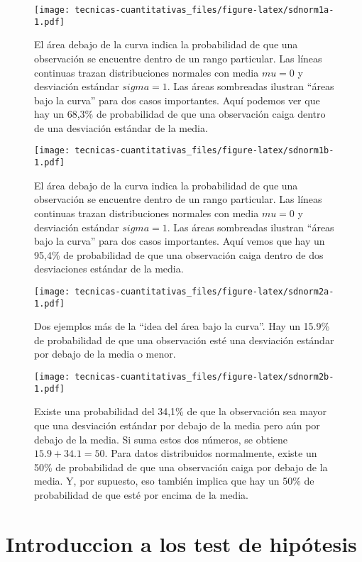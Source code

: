 \documentclass[
]{book}
\begin{document}
\begin{figure}
\centering
\texttt{[image: tecnicas-cuantitativas\_files/figure-latex/sdnorm1a-1.pdf]}
\caption{\label{fig:sdnorm1a}El área debajo de la curva indica la probabilidad de que una observación se encuentre dentro de un rango particular. Las líneas continuas trazan distribuciones normales con media \(mu=0\) y desviación estándar \(sigma=1\). Las áreas sombreadas ilustran ``áreas bajo la curva'' para dos casos importantes. Aquí podemos ver que hay un 68,3\% de probabilidad de que una observación caiga dentro de una desviación estándar de la media.}
\end{figure}

\begin{figure}
\centering
\texttt{[image: tecnicas-cuantitativas\_files/figure-latex/sdnorm1b-1.pdf]}
\caption{\label{fig:sdnorm1b}El área debajo de la curva indica la probabilidad de que una observación se encuentre dentro de un rango particular. Las líneas continuas trazan distribuciones normales con media \(mu = 0\) y desviación estándar \(sigma = 1\). Las áreas sombreadas ilustran ``áreas bajo la curva'' para dos casos importantes. Aquí vemos que hay un 95,4\% de probabilidad de que una observación caiga dentro de dos desviaciones estándar de la media.}
\end{figure}

\begin{figure}
\centering
\texttt{[image: tecnicas-cuantitativas\_files/figure-latex/sdnorm2a-1.pdf]}
\caption{\label{fig:sdnorm2a}Dos ejemplos más de la ``idea del área bajo la curva''. Hay un 15.9\% de probabilidad de que una observación esté una desviación estándar por debajo de la media o menor.}
\end{figure}

\begin{figure}
\centering
\texttt{[image: tecnicas-cuantitativas\_files/figure-latex/sdnorm2b-1.pdf]}
\caption{\label{fig:sdnorm2b}Existe una probabilidad del 34,1\% de que la observación sea mayor que una desviación estándar por debajo de la media pero aún por debajo de la media. Si suma estos dos números, se obtiene \(15.9 + 34.1 = 50\). Para datos distribuidos normalmente, existe un 50\% de probabilidad de que una observación caiga por debajo de la media. Y, por supuesto, eso también implica que hay un 50\% de probabilidad de que esté por encima de la media.}
\end{figure}

\hypertarget{introduccion-a-los-test-de-hipuxf3tesis}{%
\section{Introduccion a los test de hipótesis}\label{introduccion-a-los-test-de-hipuxf3tesis}}
\end{document}

